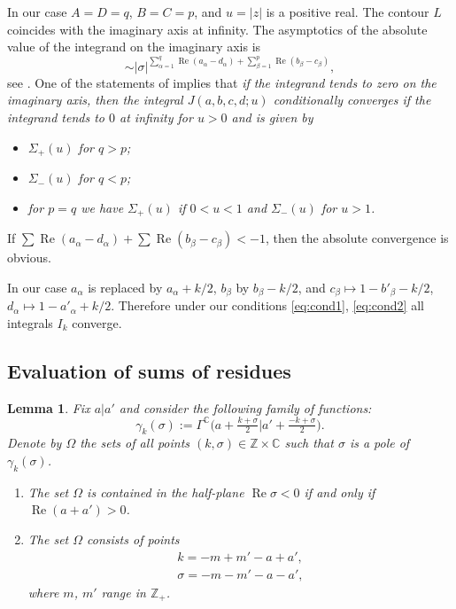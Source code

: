 \documentclass[11pt]{article}
\numberwithin{equation}{section}
\numberwithin{equation}{section}
\newtheorem{Lemma}[Theorem]{Lemma}
\renewcommand{\Re}{\mathop {\mathrm {Re}}\nolimits}
\renewcommand{\Re}{\mathop {\mathrm {Re}}\nolimits}
\def\C {{\mathbb C }}
\def\Z{{\mathbb Z}}
\begin{document}
In our case $A=D=q$, $B=C=p$, and $u=|z|$ is a positive real.
The contour $L$ coincides with the imaginary axis at infinity.
The asymptotics of the absolute value of the integrand on the imaginary axis
is
\[
\sim |\sigma|^{\sum\limits_{\alpha=1}^q\Re (a_\alpha-d_\alpha)+\sum\limits_{\beta=1}^p\Re(b_\beta- c_\beta)},
\]
see \cite[equation~(1.18(4))]{HTF1}.
One of the statements of \cite[Theorem~18]{Mar} implies that
\emph{if the integrand tends to zero on the imaginary axis,
then the integral $J(a,b,c,d;u)$ conditionally converges if
the integrand tends to $0$ at infinity for $u>0$ and is given by}
\begin{itemize}\itemsep=0pt
\item[--] \textit{$\Sigma_+(u)$ for $q>p$;}
\item[--] \textit{$\Sigma_-(u)$ for $q<p$;}
\item[--] \textit{for $p=q$ we have $\Sigma_+(u)$ if $0<u<1$ and $\Sigma_-(u)$ for $u>1$.}
\end{itemize}
If
$\sum\Re(a_\alpha-d_\alpha)+\sum\Re(b_\beta-c_\beta)<-1$,
then the absolute convergence is obvious.

In our case $a_\alpha$ is replaced by $a_\alpha+k/2$, $b_\beta$ by
$b_\beta-k/2$, and $c_\beta\mapsto 1-b'_\beta-k/2$,
$d_\alpha\mapsto 1-a'_\alpha+k/2$.
Therefore under our conditions \eqref{eq:cond1}, \eqref{eq:cond2}
all integrals $I_k$ converge.

\subsection{Evaluation of sums of residues}\label{ss:evaluation}

\begin{Lemma}
Fix $a|a'$ and consider the following family of functions:
\[
\gamma_k(\sigma):=\Gamma^\C\big(a+\tfrac {k+\sigma}2\big|a'+\tfrac
{-k+\sigma}2\big).
\]
Denote by $\Omega$ the sets of all points $(k,\sigma)\in \Z\times \C$
such that $\sigma$ is a pole of $\gamma_k(\sigma)$.
\begin{enumerate}\itemsep=0pt
\item[$(a)$] The set $\Omega$ is contained in the half-plane $\Re\sigma<0$ if and only
if $\Re(a+a')>0$.
\item[$(b)$] The set $\Omega$ consists of points
\begin{gather*}
k=-m+m'-a+a', \\
\sigma= -m-m'-a-a',
\end{gather*}
where $m$, $m'$ range in $\Z_+$.
\end{enumerate}
\end{Lemma}
\end{document}

